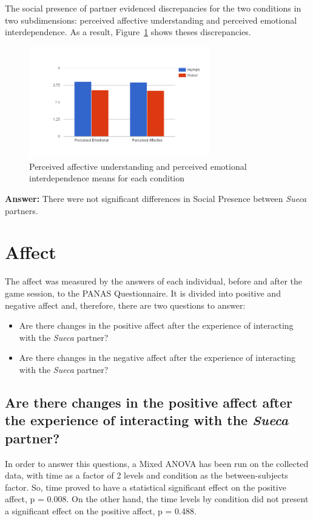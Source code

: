 The social presence of partner evidenced discrepancies for the two conditions in two subdimensions: perceived affective understanding and perceived emotional interdependence.
As a result, Figure~\ref{fig:perceiveEmoAff} shows theses discrepancies.

\begin{figure}[h!]
  \centering
    \includegraphics[width=0.7\textwidth]{./img/6/perceiveEmoAff}
  \caption{Perceived affective understanding and perceived emotional interdependence means for each  condition}
\label{fig:perceiveEmoAff}
\end{figure}

\textbf{Answer:} There were not significant differences in Social Presence between \emph{Sueca} partners.


\section{Affect}
\label{sec:affect}
The affect was measured by the answers of each individual, before and after the game session, to the PANAS Questionnaire.
It is divided into positive and negative affect and, therefore, there are two questions to answer:
\begin{itemize}
\item Are there changes in the positive affect after the experience of interacting with the \emph{Sueca} partner?
\item Are there changes in the negative affect after the experience of interacting with the \emph{Sueca} partner?
\end{itemize}

\subsection*{Are there changes in the positive affect after the experience of interacting with the \emph{Sueca} partner?}
In order to answer this questions, a Mixed ANOVA has been run on the collected data, with time as a factor of 2 levels and condition as the between-subjects factor.
So, time proved to have a statistical significant effect on the positive affect, p = 0.008.
On the other hand, the time levels by condition did not present a significant effect on the positive affect, p = 0.488.

